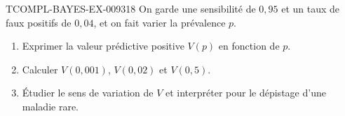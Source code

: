 \begin{exercice}{TCOMPL-BAYES-EX-009}{3}{18}
On garde une sensibilité de $0{,}95$ et un taux de faux positifs de
$0{,}04$, et on fait varier la prévalence $p$.
\begin{enumerate}
  \item Exprimer la valeur prédictive positive $V(p)$ en fonction de $p$.
  \item Calculer $V(0{,}001)$, $V(0{,}02)$ et $V(0{,}5)$.
  \item Étudier le sens de variation de $V$ et interpréter pour le dépistage
        d'une maladie rare.
\end{enumerate}
\end{exercice}
